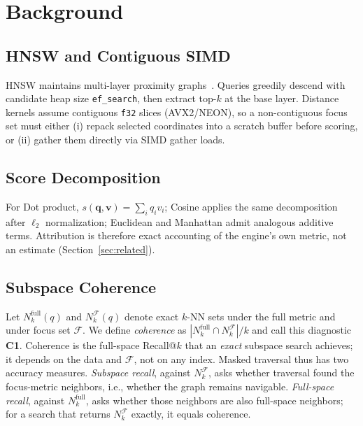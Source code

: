 \documentclass[sigconf,review,balance=false]{acmart}
\begin{document}
\section{Background}
\label{sec:background}

\subsection{HNSW and Contiguous SIMD}

HNSW maintains multi-layer proximity graphs~\cite{malkov2018hnsw}. Queries
greedily descend with candidate heap size \texttt{ef\_search}, then extract
top-$k$ at the base layer. Distance kernels assume contiguous \texttt{f32}
slices (AVX2/NEON), so a non-contiguous focus set must either (i) repack
selected coordinates into a scratch buffer before scoring, or (ii) gather them
directly via SIMD gather loads.

\subsection{Score Decomposition}

For Dot product, $s(\mathbf{q},\mathbf{v})=\sum_i q_i v_i$; Cosine applies the
same decomposition after $\ell_2$ normalization; Euclidean and Manhattan admit
analogous additive terms. Attribution is therefore exact accounting of the
engine's own metric, not an estimate (Section~\ref{sec:related}).

\subsection{Subspace Coherence}
\label{sec:coherence-def}

Let $N_k^{\mathrm{full}}(q)$ and $N_k^{\mathcal{F}}(q)$ denote exact $k$-NN sets
under the full metric and under focus set $\mathcal{F}$. We define
\emph{coherence} as $|N_k^{\mathrm{full}}\cap N_k^{\mathcal{F}}|/k$ and call
this diagnostic \textbf{C1}. Coherence is the full-space Recall@$k$ that an
\emph{exact} subspace search achieves; it depends on the data and
$\mathcal{F}$, not on any index. Masked traversal thus has two accuracy
measures. \emph{Subspace recall}, against $N_k^{\mathcal{F}}$, asks whether
traversal found the focus-metric neighbors, i.e., whether the graph remains
navigable. \emph{Full-space recall}, against $N_k^{\mathrm{full}}$, asks
whether those neighbors are also full-space neighbors; for a search that
returns $N_k^{\mathcal{F}}$ exactly, it equals coherence.
\end{document}
